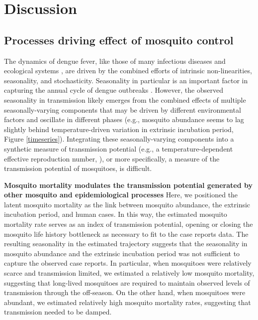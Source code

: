 \documentclass[10pt,letterpaper]{article}
\begin{document}
\section*{Discussion}

\subsection*{Processes driving effect of mosquito control}

The dynamics of dengue fever, like those of many infectious diseases \cite{Ellner1998,Koelle2004} and ecological systems \cite{Bjornstad2001}, are driven by the combined efforts of intrinsic non-linearities, seasonality, and stochasticity.
Seasonality in particular is an important factor in capturing the annual cycle of dengue outbreaks \cite{Wearing2006,Aguiar2011,Reich2013}.
However, the observed seasonality in transmission likely emerges from the combined effects of multiple seasonally-varying components that may be driven by different environmental factors and oscillate in different phases (e.g., mosquito abundance seems to lag slightly behind temperature-driven variation in extrinsic incubation period, Figure \ref{timeseries}).
Integrating these seasonally-varying components into a synthetic measure of transmission potential (e.g., a temperature-dependent effective reproduction number, \cite{Codeco2018}), or more specifically, a measure of the transmission potential of mosquitoes, is difficult.

\textbf{Mosquito mortality modulates the transmission potential generated by other mosquito and epidemiological processes}
Here, we positioned the latent mosquito mortality as the link between mosquito abundance, the extrinsic incubation period, and human cases.
In this way, the estimated mosquito mortality rate serves as an index of transmission potential, opening or closing the mosquito life history bottleneck \cite{Smith2012} as necessary to fit to the case reports data.
The resulting seasonality in the estimated trajectory suggests that the seasonality in mosquito abundance and the extrinsic incubation period was not sufficient to capture the observed case reports.
In particular, when mosquitoes were relatively scarce and transmission limited, we estimated a  relatively low mosquito mortality, suggesting that long-lived mosquitoes are required to maintain observed levels of transmission through the off-season.  
On the other hand, when mosquitoes were abundant, we estimated relatively high mosquito mortality rates, suggesting that transmission needed to be damped.
\end{document}
